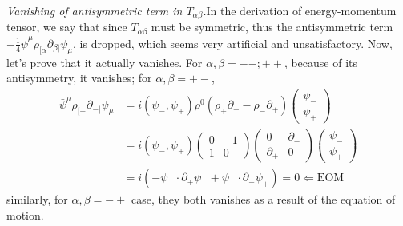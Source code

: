 \documentclass[graybox,envcountchap,sectrefs]{svmono}
\begin{document}
\emph{Vanishing of antisymmetric term in $T_{\alpha\beta}$.}\textemdash In the derivation of energy-momentum tensor, we say that since $T_{\alpha\beta}$ must be symmetric, thus the antisymmetric term $ -\frac{1}{4} \bar{\psi}^{\mu} \rho_{[ \alpha} \partial_{\beta ]} \psi_{\mu}$. is dropped, which seems very artificial and unsatisfactory. Now, let's prove that it actually vanishes. For $\alpha,\beta=--;++$, because of its antisymmetry, it vanishes; for $\alpha,\beta=+-$,
\begin{equation}
\begin{aligned}
\bar{\psi}^{\mu} \rho_{[+} \partial_{-]} \psi_{\mu} &=i\left(\psi_{-}, \psi_{+}\right) \rho^{0}\left(\rho_{+} \partial_{-}-\rho_{-} \partial_{+}\right)\left(\begin{array}{c}
\psi_{-} \\
\psi_{+}
\end{array}\right) \\
&=i\left(\psi_{-}, \psi_{+}\right)\left(\begin{array}{cc}
0 & -1 \\
1 & 0
\end{array}\right)\left(\begin{array}{cc}
0 & \partial_{-} \\
\partial_{+} & 0
\end{array}\right)\left(\begin{array}{c}
\psi_{-} \\
\psi_{+}
\end{array}\right) \\
&=i\left(-\psi_{-} \cdot \partial_{+} \psi_{-}+\psi_{+} \cdot \partial_{-} \psi_{+}\right)=0 \Leftarrow \mathrm{EOM}
\end{aligned}
\end{equation}
similarly, for $\alpha,\beta=-+$ case, they both vanishes as a result of the equation of motion.
\end{document}
